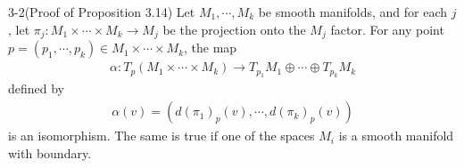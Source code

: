 \begin{customprob}{3-2(Proof of Proposition 3.14)}\label{problem_3_2}
  Let $M_1, \cdots, M_k$ be smooth manifolds, and for each $j$, let $\pi_j: M_1 \times \cdots \times M_k \rightarrow M_j$ be the projection onto the $M_j$ factor.
  For any point $p = (p_1, \cdots, p_k) \in M_1 \times \cdots \times M_k$, the map
  \begin{align*}
    \alpha: T_p(M_1 \times \cdots \times M_k) \rightarrow T_{p_1}M_1 \oplus \cdots \oplus T_{p_k}M_k
  \end{align*}
  defined by
  \begin{align*}
    \alpha(v) = (d(\pi_1)_p(v), \cdots, d(\pi_k)_p(v))
  \end{align*}
  is an isomorphism.
  The same is true if one of the spaces $M_i$ is a smooth manifold with boundary.
\end{customprob}


